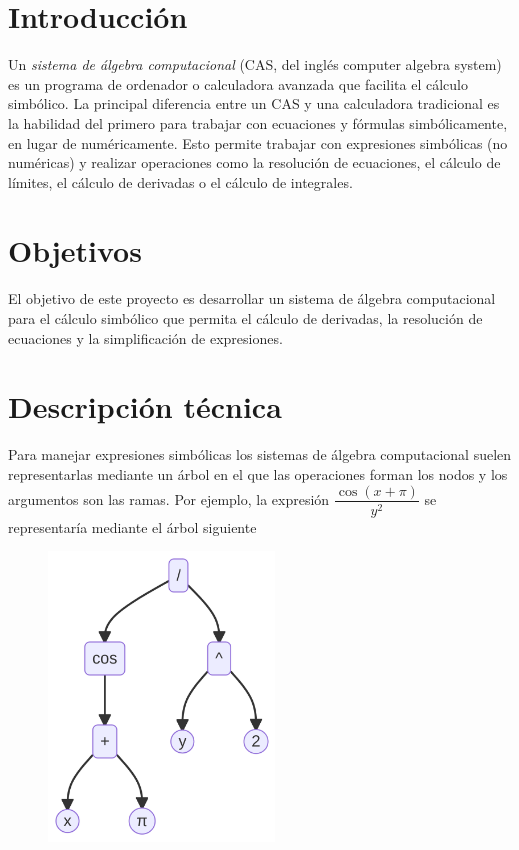 \documentclass[
  a4paper,
]{scrreport}
\begin{document}
\hypertarget{introducciuxf3n}{%
\section{Introducción}\label{introducciuxf3n}}

Un \emph{sistema de álgebra computacional} (CAS, del inglés computer
algebra system) es un programa de ordenador o calculadora avanzada que
facilita el cálculo simbólico. La principal diferencia entre un CAS y
una calculadora tradicional es la habilidad del primero para trabajar
con ecuaciones y fórmulas simbólicamente, en lugar de numéricamente.
Esto permite trabajar con expresiones simbólicas (no numéricas) y
realizar operaciones como la resolución de ecuaciones, el cálculo de
límites, el cálculo de derivadas o el cálculo de integrales.

\hypertarget{objetivos}{%
\section{Objetivos}\label{objetivos}}

El objetivo de este proyecto es desarrollar un sistema de álgebra
computacional para el cálculo simbólico que permita el cálculo de
derivadas, la resolución de ecuaciones y la simplificación de
expresiones.

\hypertarget{descripciuxf3n-tuxe9cnica}{%
\section{Descripción técnica}\label{descripciuxf3n-tuxe9cnica}}

Para manejar expresiones simbólicas los sistemas de álgebra
computacional suelen representarlas mediante un árbol en el que las
operaciones forman los nodos y los argumentos son las ramas. Por
ejemplo, la expresión \(\dfrac{\cos(x+\pi)}{y^2}\) se representaría
mediante el árbol siguiente

\hypertarget{arbol-expresion}{}
\begin{figure}[H]

{\centering \includegraphics[width=2.37in,height=3.03in]{calculo-simbolico_files/figure-latex/mermaid-figure-1.png}

}

\end{figure}
\end{document}
